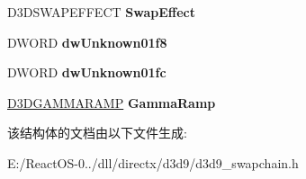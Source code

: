 \begin{DoxyCompactItemize}
$$D3\+D\+S\+W\+A\+P\+E\+F\+F\+E\+CT {\bfseries Swap\+Effect}
\item 
\mbox{\label{struct___direct3_d_swap_chain9___i_n_t_a2a9a69fb4331b1fa08d1b1af17e095c9}} 
D\+W\+O\+RD {\bfseries dw\+Unknown01f8}
\item 
\mbox{\label{struct___direct3_d_swap_chain9___i_n_t_a43f06dd4d13df2468b9c9f7702cd2f10}} 
D\+W\+O\+RD {\bfseries dw\+Unknown01fc}
\item 
\mbox{\label{struct___direct3_d_swap_chain9___i_n_t_aba475ad7942396149902fbbe7ff6cdc3}} 
\hyperlink{struct___d3_d_g_a_m_m_a_r_a_m_p}{D3\+D\+G\+A\+M\+M\+A\+R\+A\+MP} {\bfseries Gamma\+Ramp}
\end{DoxyCompactItemize}


该结构体的文档由以下文件生成\+:\begin{DoxyCompactItemize}
\item 
E\+:/\+React\+O\+S-\/0../dll/directx/d3d9/d3d9\+\_\+swapchain.\+h\end{DoxyCompactItemize}
